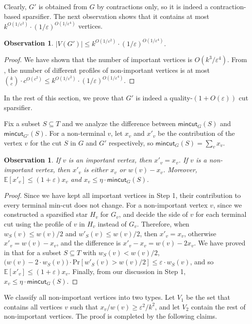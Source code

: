 \documentclass[11pt]{article}
\newtheorem{observation}[theorem]{Observation}
\theoremstyle{definition}
\newcommand{\eps}{{\varepsilon}}
\def\pr#1{\mathrm{Pr}\left[ #1 \right]}
\def\ex#1{{\mathbb{E}}\left[ #1 \right]}
\newcommand{\mc}{\mathsf{mincut}}
\begin{document}
Clearly, $G'$ is obtained from $G$ by contractions only, so it is indeed a contraction-based sparsifier. The next observation shows that it contains at most 
$k^{O(1/\eps^2)}\cdot (1/\eps)^{O(1/\eps^4)}$ vertices.

\begin{observation}
$|V(G')|\le k^{O(1/\eps^2)}\cdot (1/\eps)^{O(1/\eps^4)}$.
\end{observation} 
\begin{proof}
We have shown that the number of important vertices is $O(k^3/\eps^4)$. From , the number of different profiles of non-important vertices is at most $\binom{k}{c}\cdot c^{O(c^2)}\le k^{O(1/\eps^2)}\cdot (1/\eps)^{O(1/\eps^4)}$.
\end{proof}

In the rest of this section, we prove that $G'$ is indeed a quality-$(1+O(\eps))$ cut sparsifier.

Fix a subset $S\subseteq T$ and we analyze the difference between $\mc_G(S)$ and $\mc_{G'}(S)$.
For a non-terminal $v$, let $x_v$ and $x'_v$ be the contribution of the vertex $v$ for the cut $S$ in $G$ and $G'$ respectively, so $\mc_G(S) = \sum_v x_v$. 

\begin{observation}
If $v$ is an important vertex, then $x'_v=x_v$. If $v$ is a non-important vertex, then $x'_v$ is either $x_v$ or $w(v)-x_v$. Moreover, $\ex{x'_v} \le (1+\eps)x_v$ and $x_v \le \eta \cdot \mc_G(S)$.
\end{observation}
\begin{proof}
Since we have kept all important vertices in Step 1, their contribution to every terminal min-cut does not change.
For a non-important vertex $v$, since we constructed a sparsified star $H_v$ for $G_v$, and decide the side of $v$ for each terminal cut using the profile of $v$ in $H_v$ instead of $G_v$. 
Therefore, when $w_S(v)\le w(v)/2$ and $w'_S(v)\le w(v)/2$, then $x'_v=x_v$, otherwise $x'_v=w(v)-x_v$, and the difference is $x'_v-x_v=w(v)-2x_v$.
We have proved in  that for a subset $S\subseteq T$ with $w_S(v)<w(v)/2$, $\big(w(v)-2\cdot w_S(v)\big) \cdot \pr{w'_S(v)>w(v)/2} \le \eps \cdot w_S(v)$, and so $\ex{x'_v} \le (1+\eps)x_v$. Finally, from our discussion in Step 1, $x_v \le \eta \cdot \mc_G(S)$. 
\end{proof}

We classify all non-important vertices into two types. 
Let $V_1$ be the set that contains all vertices $v$ such that $x_v/w(v) \ge \eps^2/k^2$, and let $V_2$ contain the rest of non-important vertices. 
The proof is completed by the following claims.
\end{document}
